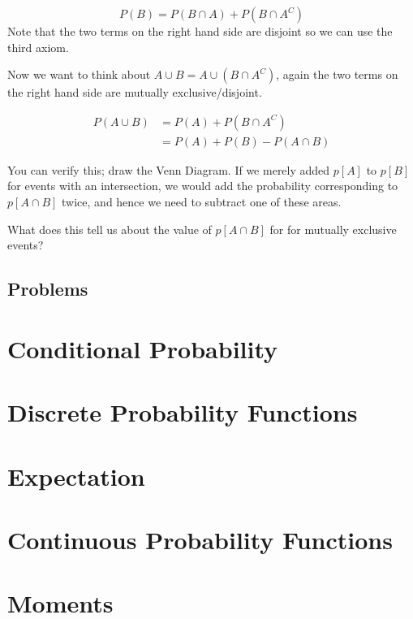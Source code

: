 \documentclass{book}
\begin{document}
\begin{displaymath}
P(B) = P(B \cap A) + P(B \cap A^C)
\end{displaymath}
Note that the two terms on the right hand side are disjoint so we can use the third axiom.

Now we want to think about $A \cup B = A \cup (B \cap A^C)$, again the two terms on the right hand side are mutually exclusive/disjoint.   

\begin{align*}
P(A \cup B) &= P(A) + P(B \cap A^C) \\
 &= P(A) + P(B) - P(A \cap B)
 \end{align*}



You can verify this; draw the Venn Diagram.   If we merely added $p[A]$ to $p[B]$ for events with an intersection, we would add the probability corresponding to $p[A \cap B]$ twice, and hence we need to subtract one of these areas.

{\color{green}What does this tell us about the value of $p[A \cap B]$ for for mutually exclusive events?}


\section{Problems}
\begin{enumerate}


\end{enumerate}



\chapter{Conditional Probability}

\chapter{Discrete Probability Functions}

\chapter{Expectation}

\chapter{Continuous Probability Functions}
\chapter{Moments}
\end{document}
